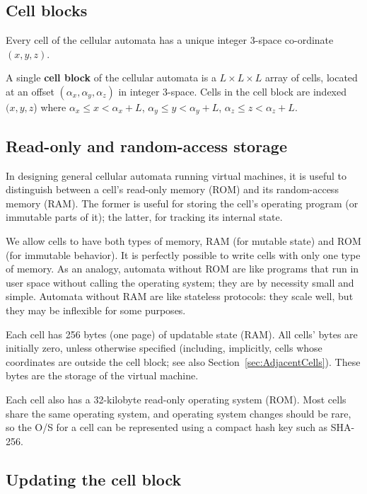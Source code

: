 \documentclass{article}
\begin{document}
\subsection{Cell blocks}

Every cell of the cellular automata has a unique integer 3-space co-ordinate $(x,y,z)$.

A single {\bf cell block} of the cellular automata is a $L \times L \times L$ array of cells,
located at an offset $(\alpha_x,\alpha_y,\alpha_z)$ in integer 3-space.
Cells in the cell block are indexed $(x,y,z$) where
$\alpha_x \leq x < \alpha_x+L$,
$\alpha_y \leq y < \alpha_y+L$,
$\alpha_z \leq z < \alpha_z+L$.

\subsection{Read-only and random-access storage}
\label{sec:Storage}

In designing general cellular automata running virtual machines,
it is useful to distinguish between a cell's read-only memory (ROM)
and its random-access memory (RAM).
The former is useful for storing the cell's operating program (or immutable parts of it); the latter, for tracking its internal state.

We allow cells to have both types of memory, RAM (for mutable state) and ROM (for immutable behavior).
It is perfectly possible to write cells with only one type of memory.
As an analogy, automata without ROM are like programs that run in user space without calling the operating system; they are by necessity small and simple.
Automata without RAM are like stateless protocols: they scale well, but they may be inflexible for some purposes.

Each cell has 256 bytes (one page) of updatable state (RAM).
All cells' bytes are initially zero, unless otherwise specified
(including, implicitly, cells whose coordinates are outside the cell block; see also Section~\ref{sec:AdjacentCells}).
These bytes are the storage of the virtual machine.

Each cell also has a 32-kilobyte read-only operating system (ROM).
Most cells share the same operating system, and operating system changes should be rare,
so the O/S for a cell can be represented using a compact hash key such as SHA-256.

\subsection{Updating the cell block}
\label{sec:UpdatingCellBlock}
\end{document}
